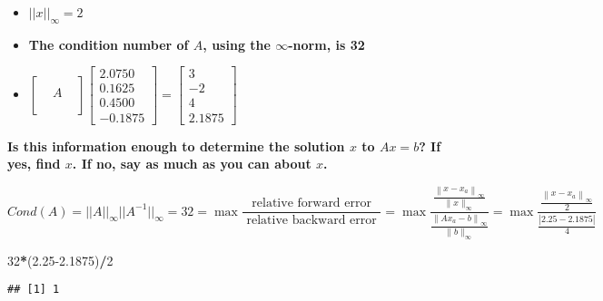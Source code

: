 \documentclass[]{article}
\newenvironment{Shaded}{\begin{snugshade}}{\end{snugshade}}
\newcommand{\DecValTok}[1]{\textcolor[rgb]{0.00,0.00,0.81}{#1}}
\newcommand{\FloatTok}[1]{\textcolor[rgb]{0.00,0.00,0.81}{#1}}
\newcommand{\NormalTok}[1]{#1}
\newcommand{\OperatorTok}[1]{\textcolor[rgb]{0.81,0.36,0.00}{\textbf{#1}}}
\begin{document}
\begin{itemize}
\item
  \(||x||_{\infty}=2\)
\item
  \textbf{The condition number of \(A\), using the \(\infty\)-norm, is
  32}
\item
  \textbf{\(\left[\begin{array}{ccc} && \\ & A & \\ && \\ && \end{array}\right] \left[\begin{array}{r}2.0750 \\ 0.1625 \\ 0.4500 \\ -0.1875 \end{array}\right]=\left[\begin{array}{c}3 \\ -2 \\ 4 \\ 2.1875 \end{array}\right]\)}
\end{itemize}

\textbf{Is this information enough to determine the solution \(x\) to
\(Ax=b\)? If yes, find \(x\). If no, say as much as you can about
\(x\).}


\iffalse{} {Solution. } \fi{}\[
Cond(A)=||A||_{\infty}||A^{-1}||_{\infty}=32=\max\frac{\text { relative forward error }}{\text { relative backward error }}=\max\frac{\frac{\left\|x-x_{a}\right\|_{\infty}}{\|x\|_{\infty}}}{\frac{\left\|A x_{a}-b\right\|_{\infty}}{\|b\|_{\infty}}}=\max\frac{\frac{\left\|x-x_{a}\right\|_{\infty}}{2}}{\frac{|2.25-2.1875|}{4}}
\]


\begin{Shaded}
\begin{Highlighting}[]
\DecValTok{32}\OperatorTok{*}\NormalTok{(}\FloatTok{2.25-2.1875}\NormalTok{)}\OperatorTok{/}\DecValTok{2}
\end{Highlighting}
\end{Shaded}

\begin{verbatim}
## [1] 1
\end{verbatim}
\end{document}
